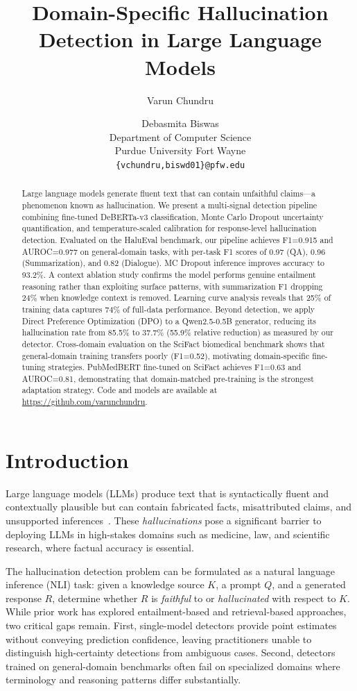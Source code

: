 \documentclass[11pt]{article}
\title{Domain-Specific Hallucination Detection in Large Language Models}
\author{Varun Chundru \and Debasmita Biswas \\
  Department of Computer Science \\
  Purdue University Fort Wayne \\
  \texttt{\{vchundru,biswd01\}@pfw.edu}}
\begin{document}
\maketitle

\begin{abstract}
Large language models generate fluent text that can contain unfaithful claims---a phenomenon known as hallucination. We present a multi-signal detection pipeline combining fine-tuned DeBERTa-v3 classification, Monte Carlo Dropout uncertainty quantification, and temperature-scaled calibration for response-level hallucination detection. Evaluated on the HaluEval benchmark, our pipeline achieves F1=0.915 and AUROC=0.977 on general-domain tasks, with per-task F1 scores of 0.97 (QA), 0.96 (Summarization), and 0.82 (Dialogue). MC Dropout inference improves accuracy to 93.2\%. A context ablation study confirms the model performs genuine entailment reasoning rather than exploiting surface patterns, with summarization F1 dropping 24\% when knowledge context is removed. Learning curve analysis reveals that 25\% of training data captures 74\% of full-data performance. Beyond detection, we apply Direct Preference Optimization (DPO) to a Qwen2.5-0.5B generator, reducing its hallucination rate from 85.5\% to 37.7\% (55.9\% relative reduction) as measured by our detector. Cross-domain evaluation on the SciFact biomedical benchmark shows that general-domain training transfers poorly (F1=0.52), motivating domain-specific fine-tuning strategies. PubMedBERT fine-tuned on SciFact achieves F1=0.63 and AUROC=0.81, demonstrating that domain-matched pre-training is the strongest adaptation strategy. Code and models are available at \url{https://github.com/varunchundru}.
\end{abstract}

\section{Introduction}

Large language models (LLMs) produce text that is syntactically fluent and contextually plausible but can contain fabricated facts, misattributed claims, and unsupported inferences~\citep{ji2023survey}. These \textit{hallucinations} pose a significant barrier to deploying LLMs in high-stakes domains such as medicine, law, and scientific research, where factual accuracy is essential.

The hallucination detection problem can be formulated as a natural language inference (NLI) task: given a knowledge source $K$, a prompt $Q$, and a generated response $R$, determine whether $R$ is \textit{faithful} to or \textit{hallucinated} with respect to $K$. While prior work has explored entailment-based and retrieval-based approaches, two critical gaps remain. First, single-model detectors provide point estimates without conveying prediction confidence, leaving practitioners unable to distinguish high-certainty detections from ambiguous cases. Second, detectors trained on general-domain benchmarks often fail on specialized domains where terminology and reasoning patterns differ substantially.
\end{document}
